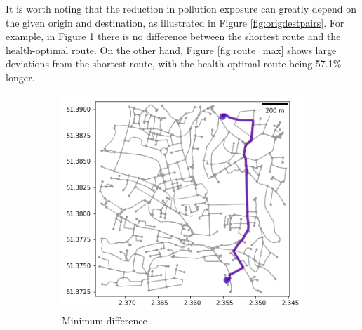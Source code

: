 \documentclass[11pt]{report}
\begin{document}

It is worth noting that the reduction in pollution exposure can greatly depend on the given origin and destination, as illustrated in Figure \ref{fig:origdestpairs}. For example, in Figure \ref{fig:route_min} there is no difference between the shortest route and the health-optimal route. On the other hand, Figure \ref{fig:route_max} shows large deviations from the shortest route, with the health-optimal route being 57.1\% longer.

\begin{figure}[!tb]
    \centering
    \begin{minipage}{1\linewidth}
            \begin{subfigure}[t]{.5\linewidth}
                \includegraphics[width=\textwidth]{images/health_optimal_route_min}
                \caption{Minimum difference}
                \label{fig:route_min}
            \end{subfigure}
            \begin{subfigure}[t]{.5\linewidth}

\end{subfigure}
\end{minipage}
\end{figure}
\end{document}
